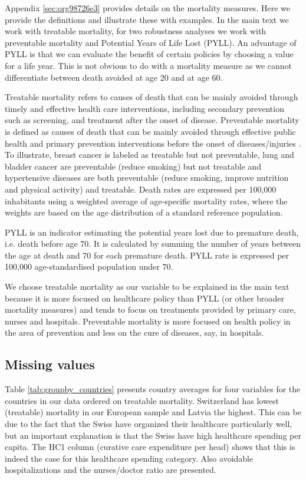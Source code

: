 \documentclass[a4paper,12pt]{article}
\begin{document}
Appendix \ref{sec:org98726e3} provides details on the mortality measures. Here we provide the definitions and illustrate these with examples. In the main text we work with treatable mortality, for two robustness analyses we work with preventable mortality and Potential Years of Life Lost (PYLL). An advantage of PYLL is that we can evaluate the benefit of certain policies by choosing a value for a life year. This is not obvious to do with a mortality measure as we cannot differentiate between death avoided at age 20 and at age 60.

Treatable mortality refers to causes of death that can be mainly avoided through timely and effective health care interventions, including secondary prevention such as screening, and treatment after the onset of disease. Preventable mortality is defined as causes of death that can be mainly avoided through effective public health and primary prevention interventions before the onset of diseases/injuries \citep{countryprofileUK}. To illustrate, breast cancer is labeled as treatable but not preventable, lung and bladder cancer are preventable (reduce smoking) but not treatable and hypertensive diseases are both preventable (reduce smoking, improve nutrition and physical activity) and treatable. Death rates are expressed per 100,000 inhabitants using a weighted average of age-specific mortality rates, where the weights are based on the age distribution of a standard reference population.

PYLL is an indicator estimating the potential years lost due to premature death, i.e. death before age 70. It is calculated by summing the number of years between the age at death and 70 for each premature death. PYLL rate is expressed per 100,000 age-standardised population under 70.

We choose treatable mortality as our variable to be explained in the main text because it is more focused on healthcare policy than PYLL (or other broader mortality measures) and tends to focus on treatments provided by primary care, nurses and hospitals. Preventable mortality is more focused on health policy in the area of prevention and less on the cure of diseases, say, in hospitals.



\subsection{Missing values}
\label{sec:orgab9342c}

Table \ref{tab:groupby_countries} presents country averages for four variables for the countries in our data ordered on treatable mortality. Switzerland has lowest (treatable) mortality in our European sample and Latvia the highest. This can be due to the fact that the Swiss have organized their healthcare particularly well, but an important explanation is that the Swiss have high healthcare spending per capita. The HC1 column (curative care expenditure per head) shows that this is indeed the case for this healthcare spending category. Also  avoidable hospitalizations and the nurses/doctor ratio are presented.
\end{document}
